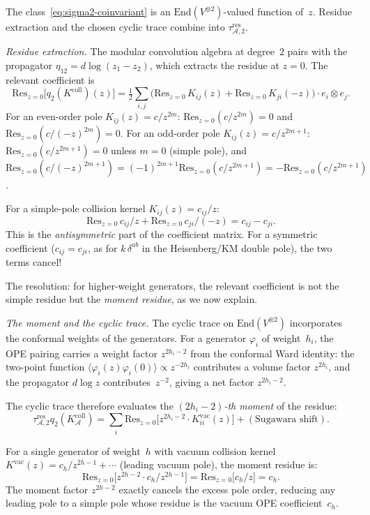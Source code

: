 \documentclass[11pt,reqno]{amsart}
\theoremstyle{definition}
\theoremstyle{remark}
\newcommand{\cA}{\mathcal{A}}
\newcommand{\End}{\mathrm{End}}
\newcommand{\Res}{\mathrm{Res}}
\numberwithin{equation}{section}
\begin{document}
The class~\eqref{eq:sigma2-coinvariant} is an
$\End(V^{\otimes2})$-valued function of~$z$.  Residue extraction and
the chosen cyclic trace combine into
$\tau_{\cA,2}^{\mathrm{res}}$.

\medskip\noindent
\emph{Residue extraction.}
The modular convolution algebra at degree~$2$ pairs
with the propagator $\eta_{12} = d\log(z_1 - z_2)$, which
extracts the residue at $z = 0$. The relevant coefficient is
\begin{equation}\label{eq:residue-step}
\Res_{z=0}\bigl[q_2(K^{\mathrm{coll}})(z)\bigr]
= \tfrac{1}{2}\sum_{i,j}
\bigl(\Res_{z=0}\,K_{ij}(z) + \Res_{z=0}\,K_{ji}(-z)\bigr)
\cdot e_i\otimes e_j.
\end{equation}
For an even-order pole $K_{ij}(z) = c/z^{2m}$:
$\Res_{z=0}(c/z^{2m}) = 0$ and
$\Res_{z=0}(c/(-z)^{2m}) = 0$.
For an odd-order pole $K_{ij}(z) = c/z^{2m+1}$:
$\Res_{z=0}(c/z^{2m+1}) = 0$ unless $m = 0$
(simple pole), and
$\Res_{z=0}(c/(-z)^{2m+1})
= (-1)^{2m+1}\Res_{z=0}(c/z^{2m+1})
= -\Res_{z=0}(c/z^{2m+1})$.

For a simple-pole collision kernel $K_{ij}(z) = c_{ij}/z$:
\[
\Res_{z=0}\,c_{ij}/z + \Res_{z=0}\,c_{ji}/(-z)
= c_{ij} - c_{ji}.
\]
This is the \emph{antisymmetric} part of the coefficient
matrix. For a symmetric coefficient ($c_{ij} = c_{ji}$,
as for $k\,\delta^{ab}$ in the Heisenberg/KM double pole),
the two terms cancel!

The resolution: for higher-weight generators, the relevant
coefficient is not the simple residue but the
\emph{moment residue}, as we now explain.

\medskip\noindent
\emph{The moment and the cyclic trace.}
The cyclic trace on $\End(V^{\otimes 2})$ incorporates the
conformal weights of the generators. For a generator
$\varphi_i$ of weight~$h_i$, the OPE pairing carries a
weight factor $z^{2h_i - 2}$ from the conformal Ward identity:
the two-point function
$\langle\varphi_i(z)\varphi_i(0)\rangle \propto z^{-2h_i}$
contributes a volume factor $z^{2h_i}$, and the propagator
$d\log z$ contributes~$z^{-2}$, giving a net factor
$z^{2h_i - 2}$.

The cyclic trace therefore evaluates the
\emph{$(2h_i{-}2)$-th moment} of the residue:
\begin{equation}\label{eq:cyclic-trace-moment}
\tau_{\cA,2}^{\mathrm{res}}q_2(K_\cA^{\mathrm{coll}})
= \sum_i \Res_{z=0}\bigl[z^{2h_i - 2}\cdot
 K_{ii}^{\mathrm{vac}}(z)\bigr]
+ (\text{Sugawara shift}).
\end{equation}

For a single generator of weight~$h$ with vacuum collision kernel
$K^{\mathrm{vac}}(z) = c_h/z^{2h-1} + \cdots$
(leading vacuum pole), the moment residue is:
\begin{equation}\label{eq:moment-residue}
\Res_{z=0}\bigl[z^{2h-2}\cdot c_h/z^{2h-1}\bigr]
= \Res_{z=0}\bigl[c_h/z\bigr] = c_h.
\end{equation}
The moment factor $z^{2h-2}$ exactly cancels the
excess pole order, reducing any leading pole to a simple pole
whose residue is the vacuum OPE coefficient~$c_h$.
\end{document}
